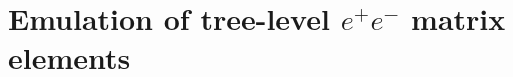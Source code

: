\documentclass[main.tex]{subfiles}
\begin{document}
\chapter{Emulation of tree-level $e^{+}e^{-}$ matrix elements}
\label{chapter:fame1}
\end{document}
